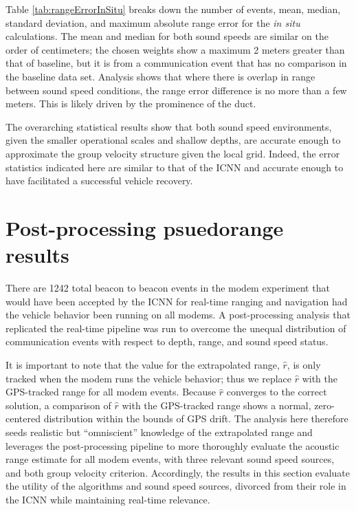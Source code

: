 Table \ref{tab:rangeErrorInSitu} breaks down the number of events, mean, median, standard deviation, and maximum absolute range error for the \textit{in situ} calculations.
The mean and median for both sound speeds are similar on the order of centimeters; the chosen weights show a maximum 2 meters greater than that of baseline, but it is from a communication event that has no comparison in the baseline data set.
Analysis shows that where there is overlap in range between sound speed conditions, the range error difference is no more than a few meters.
This is likely driven by the prominence of the duct.

The overarching statistical results show that both sound speed environments, given the smaller operational scales and shallow depths, are accurate enough to approximate the group velocity structure given the local grid.
Indeed, the error statistics indicated here are similar to that of the ICNN \citep{randeni_high-resolution_2021} and accurate enough to have facilitated a successful vehicle recovery.

\FloatBarrier
\section{\label{sec:postprocess} Post-processing psuedorange results}

There are 1242 total beacon to beacon events in the modem experiment that would have been accepted by the ICNN for real-time ranging and navigation had the vehicle behavior been running on all modems.
A post-processing analysis that replicated the real-time pipeline was run to overcome the unequal distribution of communication events with respect to depth, range, and sound speed status.

It is important to note that the value for the extrapolated range, $\hat{r}$, is only tracked when the modem runs the vehicle behavior; thus we replace $\hat{r}$ with the GPS-tracked range for all modem events.
Because $\hat{r}$ converges to the correct solution, a comparison of $\hat{r}$ with the GPS-tracked range shows a normal, zero-centered distribution within the bounds of GPS drift.
The analysis here therefore seeds realistic but ``omniscient'' knowledge of the extrapolated range and leverages the post-processing pipeline to more thoroughly evaluate the acoustic range estimate for all modem events, with three relevant sound speed sources, and both group velocity criterion.
Accordingly, the results in this section evaluate the utility of the algorithms and sound speed sources, divorced from their role in the ICNN while maintaining real-time relevance.

